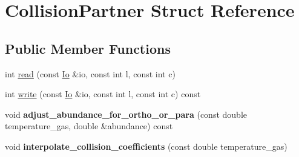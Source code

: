 \hypertarget{structCollisionPartner}{}\section{Collision\+Partner Struct Reference}
\label{structCollisionPartner}
\subsection*{Public Member Functions}
\begin{DoxyCompactItemize}
\item 
int \mbox{\hyperlink{structCollisionPartner_a657070fe480d542b6c1cd55a4d5656b5}{read}} (const \mbox{\hyperlink{structIo}{Io}} \&io, const int l, const int c)
\item 
int \mbox{\hyperlink{structCollisionPartner_ac561a4be0113365b04fe125e0c14f2b0}{write}} (const \mbox{\hyperlink{structIo}{Io}} \&io, const int l, const int c) const
\item 
\mbox{\label{structCollisionPartner_a88ad806d3f3ec6f4298e2c10d75fdf07}} 
void {\bfseries adjust\+\_\+abundance\+\_\+for\+\_\+ortho\+\_\+or\+\_\+para} (const double temperature\+\_\+gas, double \&abundance) const
\item 
\mbox{\label{structCollisionPartner_aa26722c35992b461e7c7e949fe7159f6}} 
void {\bfseries interpolate\+\_\+collision\+\_\+coefficients} (const double temperature\+\_\+gas)
\end{DoxyCompactItemize}

